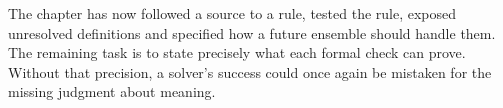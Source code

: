 The chapter has now followed a source to a rule, tested the rule, exposed
unresolved definitions and specified how a future ensemble should handle them.
The remaining task is to state precisely what each formal check can prove.
Without that precision, a solver's success could once again be mistaken for
the missing judgment about meaning.
